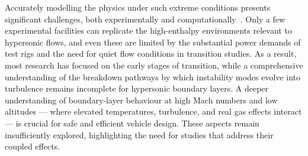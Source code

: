 Accurately modelling the physics under such extreme conditions presents significant challenges, both experimentally and computationally~\citep{DiRenzo2021}. Only a few experimental facilities can replicate the high-enthalpy environments relevant to hypersonic flows, and even these are limited by the substantial power demands of test rigs and the need for quiet flow conditions in transition studies. As a result, most research has focused on the early stages of transition, while a comprehensive understanding of the breakdown pathways by which instability modes evolve into turbulence remains incomplete for hypersonic boundary layers. A deeper understanding of boundary-layer behaviour at high Mach numbers and low altitudes — where elevated temperatures, turbulence, and real gas effects interact — is crucial for safe and efficient vehicle design. These aspects remain insufficiently explored, highlighting the need for studies that address their coupled effects.






